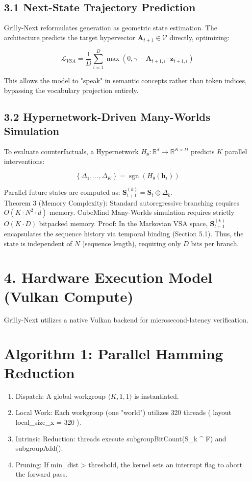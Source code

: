 \documentclass[10pt]{article}
\begin{document}
\subsection*{3.1 Next-State Trajectory Prediction}
Grilly-Next reformulates generation as geometric state estimation. The architecture predicts the target hypervector $\mathbf{A}_{t+1} \in \mathcal{V}$ directly, optimizing:

$$
\mathcal{L}_{V S A}=\frac{1}{D} \sum_{i=1}^{D} \max \left(0, \gamma-\mathbf{A}_{t+1, i} \cdot \mathbf{z}_{t+1, i}\right)
$$

This allows the model to "speak" in semantic concepts rather than token indices, bypassing the vocabulary projection entirely.

\subsection*{3.2 Hypernetwork-Driven Many-Worlds Simulation}
To evaluate counterfactuals, a Hypernetwork $H_{\theta}: \mathbb{R}^{d} \rightarrow \mathbb{R}^{K \times D}$ predicts $K$ parallel interventions:

$$
\left\{\Delta_{1}, \ldots, \Delta_{K}\right\}=\operatorname{sgn}\left(H_{\theta}\left(\mathbf{h}_{t}\right)\right)
$$

Parallel future states are computed as: $\mathbf{S}_{t+1}^{(k)}=\mathbf{S}_{t} \oplus \Delta_{k}$.\\
Theorem 3 (Memory Complexity): Standard autoregressive branching requires\\
$O\left(K \cdot N^{2} \cdot d\right)$ memory. CubeMind Many-Worlds simulation requires strictly $O(K \cdot D)$ bitpacked memory. Proof: In the Markovian VSA space, $\mathbf{S}_{t+1}^{(k)}$ encapsulates the sequence history via temporal binding (Section 5.1). Thus, the state is independent of $N$ (sequence length), requiring only $D$ bits per branch.

\section*{4. Hardware Execution Model (Vulkan Compute)}
Grilly-Next utilizes a native Vulkan backend for microsecond-latency verification.

\section*{Algorithm 1: Parallel Hamming Reduction}
\begin{enumerate}
  \item Dispatch: A global workgroup $\langle K, 1,1\rangle$ is instantiated.
  \item Local Work: Each workgroup (one "world") utilizes 320 threads ( layout local\_size\_x = 320 ).
  \item Intrinsic Reduction: threads execute subgroupBitCount(S\_k \^{} F) and subgroupAdd().
  \item Pruning: If min\_dist > threshold, the kernel sets an interrupt flag to abort the forward pass.
\end{enumerate}
\end{document}
